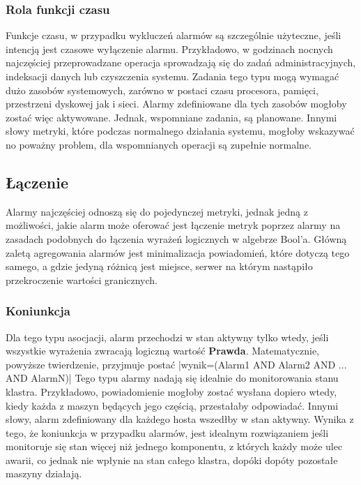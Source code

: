         \subsubsection{Rola funkcji czasu}
        Funkcje czasu, w przypadku wykluczeń alarmów są szczególnie użyteczne, jeśli intencją jest czasowe wyłączenie
        alarmu. Przykładowo, w godzinach nocnych najczęściej przeprowadzane operacja sprowadzają się do zadań 
        administracyjnych, indeksacji danych lub czyszczenia systemu. Zadania tego typu mogą wymagać dużo
        zasobów systemowych, zarówno w postaci czasu procesora, pamięci, przestrzeni dyskowej jak i sieci.
        Alarmy zdefiniowane dla tych zasobów mogłoby zostać więc aktywowane. Jednak, wspomniane zadania, 
        są planowane. Innymi słowy metryki, które podczas normalnego działania systemu, mogłoby wskazywać
        no poważny problem, dla wspomnianych operacji są zupełnie normalne. 
    
    \subsection{Łączenie}
    \label{chapter:monitoring:anatomy_of_alarm:assocation}
    
        Alarmy najczęściej odnoszą się do pojedynczej metryki, jednak jedną z możliwości, jakie alarm może
        oferować jest łączenie metryk poprzez alarmy na zasadach podobnych do łączenia wyrażeń
        logicznych w algebrze Bool'a. Główną zaletą agregowania alarmów jest minimalizacja powiadomień, 
        które dotyczą tego samego, a gdzie jedyną różnicą jest miejsce, serwer na którym nastąpiło
        przekroczenie wartości granicznych. 
    
        \subsubsection{Koniunkcja}
        \label{chapter:monitoring:anatomy_of_alarm:assocation:and}
        Dla tego typu asocjacji, alarm przechodzi w stan aktywny tylko wtedy, jeśli wszystkie wyrażenia
        zwracają logiczną wartość \textbf{Prawda}. Matematycznie, powyższe twierdzenie, przyjmuje postać
        |wynik=(Alarm1 AND Alarm2 AND ... AND AlarmN)|
        Tego typu alarmy nadają się idealnie
        do monitorowania stanu klastra. Przykładowo, powiadomienie mogłoby zostać wysłana dopiero 
        wtedy, kiedy każda z maszyn będących jego częścią, przestałaby odpowiadać. Innymi słowy,
        alarm zdefiniowany dla każdego hosta wszedłby w stan aktywny. Wynika z tego, że koniunkcja
        w przypadku alarmów, jest idealnym rozwiązaniem jeśli monitoruje się stan więcej niż jednego
        komponentu, z których każdy może ulec awarii, co jednak nie wpłynie na stan całego klastra, dopóki
        dopóty pozostałe maszyny działają.
        
